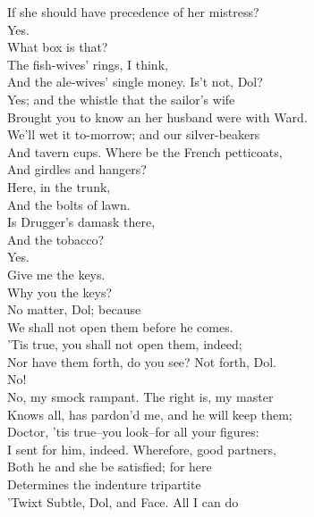 \documentclass{memoir}
\begin{document}
\begin{drama*}
\facespeaks  If she should have precedence of her mistress?\\
\dolspeaks  Yes.\\
\facespeaks {} What box is that?\\
\subtlespeaks {} The fish-wives' rings, I think,\\
 And the ale-wives' single money. Is't not, Dol?\\
\dolspeaks  Yes; and the whistle that the sailor's wife\\
 Brought you to know an her husband were with Ward.\\
\facespeaks  We'll wet it to-morrow; and our silver-beakers\\
 And tavern cups. Where be the French petticoats,\\
 And girdles and hangers?\\
\subtlespeaks {} Here, in the trunk,\\
 And the bolts of lawn.\\
\facespeaks {} Is Drugger's damask there,\\
 And the tobacco?\\
\subtlespeaks {} Yes.\\
\facespeaks {} Give me the keys.\\
\dolspeaks  Why you the keys?\\
\subtlespeaks {} No matter, Dol; because\\
 We shall not open them before he comes.\\
\facespeaks  'Tis true, you shall not open them, indeed;\\
 Nor have them forth, do you see? Not forth, Dol.\\
\dolspeaks  No!\\
\facespeaks {} No, my smock rampant. The right is, my master\\
 Knows all, has pardon'd me, and he will keep them;\\
 Doctor, 'tis true--you look--for all your figures:\\
 I sent for him, indeed. Wherefore, good partners,\\
 Both he and she be satisfied; for here\\
 Determines the indenture tripartite\\
 'Twixt Subtle, Dol, and Face. All I can do\\

\end{drama*}
\end{document}
